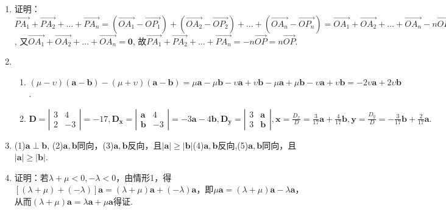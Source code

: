 \documentclass[UTF8]{ctexart}
\begin{document}
\begin{enumerate}
\item 证明：$\overrightarrow{PA_1}+\overrightarrow{PA_2}+ \dots +\overrightarrow{PA_n}=\left(\overrightarrow{OA_1}-\overrightarrow{OP_1}\right)+\left(\overrightarrow{OA_2}-\overrightarrow{OP_2}\right)+ \dots +\left(\overrightarrow{OA_n}-\overrightarrow{OP_n}\right)=\overrightarrow{OA_1}+\overrightarrow{OA_2}+ \dots +\overrightarrow{OA_n}-n\overrightarrow{OP}$,
又$\overrightarrow{OA_1}+\overrightarrow{OA_2}+ \dots +\overrightarrow{OA_n}=\boldsymbol{0}$,
故$\overrightarrow{PA_1}+\overrightarrow{PA_2}+ \dots +\overrightarrow{PA_n}=-n\overrightarrow{OP}=n\overrightarrow{OP}.$

\item 
\begin{enumerate}[(1)]
\item $\left(\mu - \upsilon\right)\left(\boldsymbol{a}-\boldsymbol{b}\right)-\left(\mu + \upsilon\right)\left(\boldsymbol{a}-\boldsymbol{b}\right)=\mu \boldsymbol{a}-\mu \boldsymbol{b}-\upsilon \boldsymbol{a}+\upsilon \boldsymbol{b}-\mu \boldsymbol{a}+\mu \boldsymbol{b}-\upsilon \boldsymbol{a}+\upsilon \boldsymbol{b}=-2\upsilon \boldsymbol{a}+2\upsilon \boldsymbol{b}$.
\item 
$\mathbf{D}=\left|\begin{array}{ccc}
3 & 4\\
2 & -3
\end{array} \right|
=-17,\mathbf{D_x}=\left|\begin{array}{ccc}\mathbf{a}&4\\ \mathbf{b}&-3\end{array}\right| =-3\mathbf{a}-4\mathbf{b},
\mathbf{D_y}=\left|\begin{array}{ccc} 3 & \mathbf{a}\\ 3 & \mathbf{b}\end{array}\right|,\mathbf{x}=\displaystyle\frac{D_x}{D}=\displaystyle\frac{3}{17}\mathbf{a}+\displaystyle\frac{4}{17}\mathbf{b},\mathbf{y}=\displaystyle\frac{D_y}{D}=-\displaystyle\frac{3}{17}\mathbf{b}+\displaystyle\frac{2}{17}\mathbf{a}.$
\end{enumerate}

\item (1)$\mathbf{a}\perp\mathbf{b}$, (2)$\mathbf{a},\mathbf{b}$同向，(3)$\mathbf{a},\mathbf{b}$反向，且$|\mathbf{a}| \geq |\mathbf{b}|$(4)$\mathbf{a},\mathbf{b}$反向,(5)$\mathbf{a},\mathbf{b}$同向，且$|\mathbf{a}| \geq |\mathbf{b}|$.

\item 证明：若$\lambda + \mu < 0, -\lambda < 0 $，由情形1，得$\left[\left(\lambda +\mu\right)+(-\lambda)\right]\mathbf{a}=(\lambda +\mu)\mathbf{a}+(-\lambda)\mathbf{a}$，即$\mu \mathbf{a}=(\lambda +\mu)\mathbf{a}-\lambda \mathbf{a}$，从而$(\lambda +\mu)\mathbf{a} = \lambda \mathbf{a}+\mu \mathbf{a}$得证.
\end{enumerate}
\end{document}
